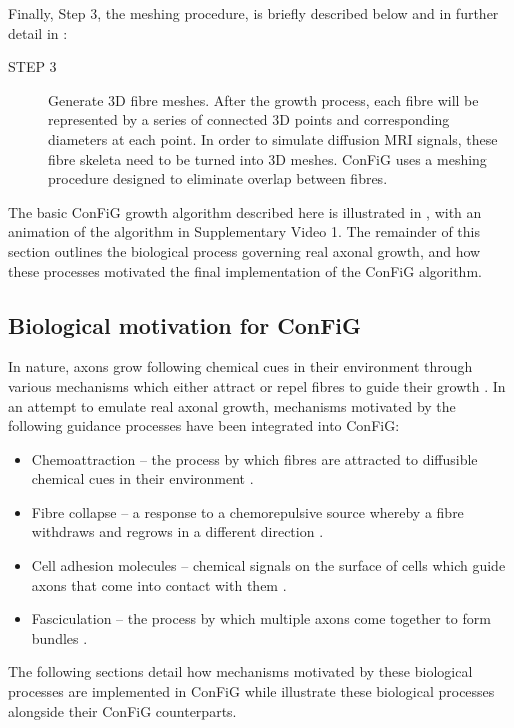 Finally, Step 3, the meshing procedure, is briefly described below and in further detail in :
\begin{description}
  \item [STEP 3] Generate 3D fibre meshes. After the growth process, each fibre will be represented by a series of connected 3D points and corresponding diameters at each point. In order to simulate diffusion MRI signals, these fibre skeleta need to be turned into 3D meshes. ConFiG uses a meshing procedure designed to eliminate overlap between fibres.
\end{description}

The basic ConFiG growth algorithm described here is illustrated in , with an animation of the algorithm in Supplementary Video 1. The remainder of this section outlines the biological process governing real axonal growth, and how these processes motivated the final implementation of the ConFiG algorithm.

\subsection{Biological motivation for ConFiG}
\label{sec:config_biol_motiv}
In nature, axons grow following chemical cues in their environment through various mechanisms which either attract or repel fibres to guide their growth \cite{Dent2011,Lowery2009,Mortimer2008,Polleux2010,Price2017,Rauch2013,Sakisaka2005}. In an attempt to emulate real axonal growth, mechanisms motivated by the following guidance processes have been integrated into ConFiG:
\begin{itemize}
  \item Chemoattraction – the process by which fibres are attracted to diffusible chemical cues in their environment \cite{Price2017,Mortimer2008}.
  \item Fibre collapse – a response to a chemorepulsive source whereby a fibre withdraws and regrows in a different direction \cite{Rauch2013}.
  \item Cell adhesion molecules – chemical signals on the surface of cells which guide axons that come into contact with them \cite{Sakisaka2005}.
  \item Fasciculation – the process by which multiple axons come together to form bundles \cite{Price2017,Smit2017}.
\end{itemize}
The following sections detail how mechanisms motivated by these biological processes are implemented in ConFiG while  illustrate these biological processes alongside their ConFiG counterparts.

